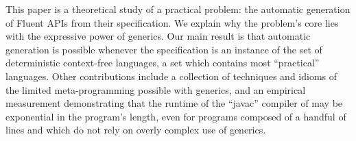This paper is a theoretical study of a practical problem:
  the automatic generation of  Fluent APIs from their specification.
We explain why the problem's core lies with 
  the expressive power of  generics.
Our main result is that automatic generation is possible whenever 
  the specification is an instance of the set of deterministic context-free languages,
  a set which contains most ``practical'' languages.
Other contributions include a collection of techniques and idioms of
  the limited meta-programming possible with  generics, 
  and an empirical measurement demonstrating that the runtime of
  the ``javac'' compiler of  may be exponential in
  the program's length, even for programs composed of 
  a handful of lines and which do not rely on overly 
  complex use of generics.
